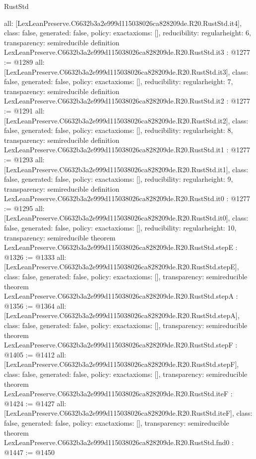 \begin{lexlean}{RustStd}
\begin{coremodule}
{  all: [LexLeanPreserve.C6632b3a2e999d115038026ca828209de.R20.RustStd.it4],
  class: false,
  generated: false,
  policy: exact{axioms: []},
  reducibility: regular{height: 6},
  transparency: semireducible
}
definition LexLeanPreserve.C6632b3a2e999d115038026ca828209de.R20.RustStd.it3 : @1277 := @1289 {
  all: [LexLeanPreserve.C6632b3a2e999d115038026ca828209de.R20.RustStd.it3],
  class: false,
  generated: false,
  policy: exact{axioms: []},
  reducibility: regular{height: 7},
  transparency: semireducible
}
definition LexLeanPreserve.C6632b3a2e999d115038026ca828209de.R20.RustStd.it2 : @1277 := @1291 {
  all: [LexLeanPreserve.C6632b3a2e999d115038026ca828209de.R20.RustStd.it2],
  class: false,
  generated: false,
  policy: exact{axioms: []},
  reducibility: regular{height: 8},
  transparency: semireducible
}
definition LexLeanPreserve.C6632b3a2e999d115038026ca828209de.R20.RustStd.it1 : @1277 := @1293 {
  all: [LexLeanPreserve.C6632b3a2e999d115038026ca828209de.R20.RustStd.it1],
  class: false,
  generated: false,
  policy: exact{axioms: []},
  reducibility: regular{height: 9},
  transparency: semireducible
}
definition LexLeanPreserve.C6632b3a2e999d115038026ca828209de.R20.RustStd.it0 : @1277 := @1295 {
  all: [LexLeanPreserve.C6632b3a2e999d115038026ca828209de.R20.RustStd.it0],
  class: false,
  generated: false,
  policy: exact{axioms: []},
  reducibility: regular{height: 10},
  transparency: semireducible
}
theorem LexLeanPreserve.C6632b3a2e999d115038026ca828209de.R20.RustStd.stepE : @1326 := @1333 {
  all: [LexLeanPreserve.C6632b3a2e999d115038026ca828209de.R20.RustStd.stepE],
  class: false,
  generated: false,
  policy: exact{axioms: []},
  transparency: semireducible
}
theorem LexLeanPreserve.C6632b3a2e999d115038026ca828209de.R20.RustStd.stepA : @1356 := @1364 {
  all: [LexLeanPreserve.C6632b3a2e999d115038026ca828209de.R20.RustStd.stepA],
  class: false,
  generated: false,
  policy: exact{axioms: []},
  transparency: semireducible
}
theorem LexLeanPreserve.C6632b3a2e999d115038026ca828209de.R20.RustStd.stepF : @1405 := @1412 {
  all: [LexLeanPreserve.C6632b3a2e999d115038026ca828209de.R20.RustStd.stepF],
  class: false,
  generated: false,
  policy: exact{axioms: []},
  transparency: semireducible
}
theorem LexLeanPreserve.C6632b3a2e999d115038026ca828209de.R20.RustStd.iteF : @1424 := @1427 {
  all: [LexLeanPreserve.C6632b3a2e999d115038026ca828209de.R20.RustStd.iteF],
  class: false,
  generated: false,
  policy: exact{axioms: []},
  transparency: semireducible
}
theorem LexLeanPreserve.C6632b3a2e999d115038026ca828209de.R20.RustStd.fnd0 : @1447 := @1450 {
}
\end{coremodule}
\end{lexlean}

